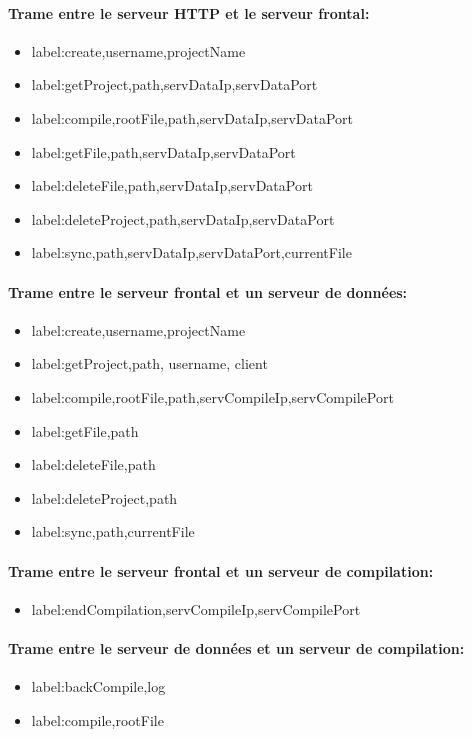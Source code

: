 \documentclass[a4paper,12pt]{article}
\begin{document}
\paragraph{Trame entre le serveur HTTP et le serveur frontal:}
\begin{itemize}
 \item label:create,username,projectName
 \item label:getProject,path,servDataIp,servDataPort
 \item label:compile,rootFile,path,servDataIp,servDataPort
 \item label:getFile,path,servDataIp,servDataPort
 \item label:deleteFile,path,servDataIp,servDataPort
 \item label:deleteProject,path,servDataIp,servDataPort
 \item label:sync,path,servDataIp,servDataPort,currentFile
\end{itemize}

\paragraph{Trame entre le serveur frontal et un serveur de données:}
\begin{itemize}
 \item label:create,username,projectName
 \item label:getProject,path, username, client
 \item label:compile,rootFile,path,servCompileIp,servCompilePort
 \item label:getFile,path
 \item label:deleteFile,path
 \item label:deleteProject,path
 \item label:sync,path,currentFile
\end{itemize}

\paragraph{Trame entre le serveur frontal et un serveur de compilation:}
\begin{itemize}
 \item label:endCompilation,servCompileIp,servCompilePort
\end{itemize}

\paragraph{Trame entre le serveur de données et un serveur de compilation:}
\begin{itemize}
 \item label:backCompile,log
 \item label:compile,rootFile
\end{itemize}
\end{document}
